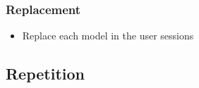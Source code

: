 \subsubsection{Replacement}
	\begin{itemize}
		\item Replace each model in the user sessions
	\end{itemize}

\subsection{Repetition}



